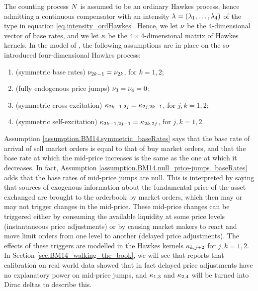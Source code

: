 \documentclass[10pt]{article}
\begin{document}
The counting process $\multiCountingProc$ is assumed to be an ordinary Hawkes process, hence admitting a continuous compensator with an intensity $\intensity[]=(\intensity[1],\dots,\intensity[4])$ of the type in equation \eqref{eq.intensity_ordHawkes}. Hence, we let $\baseRate$ be the $4$-dimensional vector of base rates, and we let $\hawkesKernel$ be the $4\times4$-dimensional matrix of Hawkes kernels. In the model of \citealp{BM14haw}, the following assumptions are in place on the so-introduced four-dimensional Hawkes process:
\begin{assumption}\label{assumption.BM14}
 \begin{enumerate}[label={\roman{*}.} , ref={\ref{assumption.BM14}.\roman{*}}]
  \item\label{assumption.BM14.symmetric_baseRates} (symmetric base rates)
  $\baseRate_{2k-1}=\baseRate_{2k}$,  for $k=1,2$;
  \item\label{assumption.BM14.null_price-jumps_baseRates} (fully endogenous price jumps) $\baseRate_3 = \baseRate_4=0$;
  \item \label{assumption.BM14.symmetric_cross-excitation}(symmetric cross-excitation)
  $\hawkesKernel_{2k-1,2j}=\hawkesKernel_{2j,2k-1}$, for $j,k=1,2$;
  \item \label{assumption.BM14.symmetric_self-excitation}(symmetric self-excitation)
  $\hawkesKernel_{2k-1,2j-1}=\hawkesKernel_{2k,2j}$, for $j,k=1,2$.
 \end{enumerate}
\end{assumption}
Assumption \ref{assumption.BM14.symmetric_baseRates} says that the base rate of arrival of sell market orders is equal to that of buy market orders, and that the base rate at which the mid-price increases is the same as the one at which it decreases. In fact, Assumption \ref{assumption.BM14.null_price-jumps_baseRates} adds that the base rates of mid-price jumps are null. This is interpreted by saying that sources of exogenous information about the fundamental price of the asset exchanged are brought to the orderbook by market orders, which then may or may not trigger changes in the mid-price. These mid-price changes can be triggered either by consuming the available liquidity at some price levels (instantaneous price adjustments) or by causing market makers to react and move limit orders from one level to another (delayed price adjustments). The effects of these triggers are modelled in the Hawkes kernels $\hawkesKernel_{k,j+2}$ for $j,k=1,2$. In Section \ref{sec.BM14_walking_the_book}, we will see that \citealp{BM14haw} reports that calibration on real world data showed that in fact delayed price adjustments have no explanatory power on mid-price jumps, and $\hawkesKernel_{1,3}$ and $\hawkesKernel_{2,4}$ will be turned into Dirac deltas to describe this.   
\end{document}
